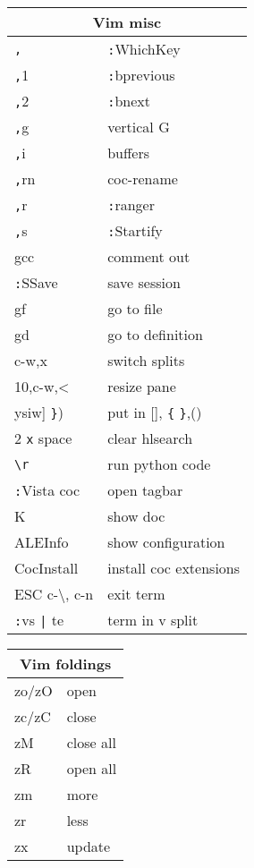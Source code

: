 \documentclass[12pt,paper=landscape,paper=a4]{scrartcl}
\begin{document}
\begin{multicols}{3}
    \vspace{1em}

    \begin{tabular}{ll}
        \multicolumn{2}{c}{Vim misc}\\
        \hline
        \verb!,! 		    & \verb!:!WhichKey\\
        \verb!,!1           & \verb!:!bprevious\\
        \verb!,!2           & \verb!:!bnext\\
        \verb!,!g           & vertical G\\
        \verb!,!i           & buffers\\
        \verb!,!rn          & coc-rename\\
        \verb!,!r           & \verb!:!ranger\\
        \verb!,!s           & \verb!:!Startify\\
        gcc                 & comment out\\
        \verb!:!SSave       & save session\\
        gf                  & go to file\\
        gd                  & go to definition\\
        c-w,x  	            & switch splits\\
        10,c-w,<            & resize pane\\
        ysiw] \verb!}!)     & put in [], \verb!{! \verb!}!,()\\
        2 \verb!x! space    & clear hlsearch\\
        \verb!\r!	        & run python code\\
        \verb!:!Vista coc   & open tagbar\\
        K                   & show doc\\
        ALEInfo             & show configuration \\
        CocInstall          & install coc extensions\\
        ESC c-\textbackslash{}, c-n     & exit term \\
        \verb!:!vs \verb!|! te          & term in v split
    \end{tabular}

    \vspace{1em}

    \begin{tabular}{ll}
        \multicolumn{2}{c}{Vim foldings}\\
        \hline
        zo/zO  & open \\
        zc/zC  & close\\
        zM     & close all\\
        zR     & open all\\
        zm     & more\\
        zr     & less\\
        zx     & update\\
    \end{tabular}
\end{multicols}
\end{document}
